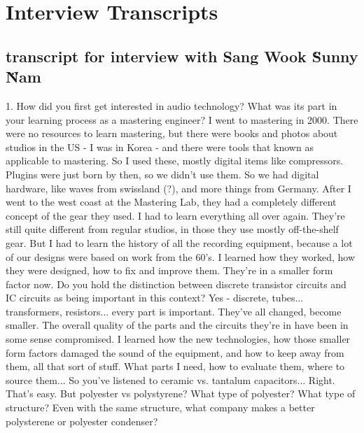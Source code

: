 
\chapter{Interview Transcripts}\label{app:inttrans} %


\section{transcript for interview with Sang Wook \" Sunny \" Nam}

1. How did you first get interested in audio technology? What was its part in your learning process as a mastering engineer?
I went to mastering in 2000. There were no resources to learn mastering, but there were books and photos about studios in the US - I was in Korea - and there were tools that known as applicable to mastering. So I used these, mostly digital items like compressors. Plugins were just born by then, so we didn't use them. So we had digital hardware, like waves from swissland (?), and more things from Germany.
After I went to the west coast at the Mastering Lab, they had a completely different concept of the gear they used. I had to learn everything all over again. They're still quite different from regular studios, in those they use mostly off-the-shelf gear. But I had to learn the history of all the recording equipment, because a lot of our designs were based on work from the 60's. I learned how they worked, how they were designed, how to fix and improve them. They're in a smaller form factor now.
Do you hold the distinction between discrete transistor circuits and IC circuits as being important in this context?
Yes - discrete, tubes... transformers, resistors... every part is important. They've all changed, become smaller. The overall quality of the parts and the circuits they're in have been in some sense compromised. I learned how the new technologies, how those smaller form factors damaged the sound of the equipment, and how to keep away from them, all that sort of stuff. What parts I need, how to evaluate them, where to source them...
So you've listened to ceramic vs. tantalum capacitors...
Right. That's easy. But polyester vs polystyrene? What type of polyester? What type of structure? Even with the same structure, what company makes a better polysterene or polyester condenser?
